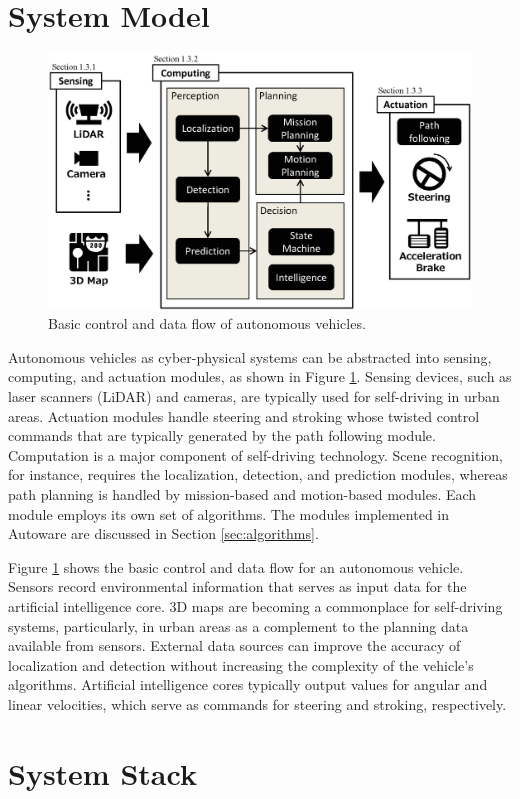 \section{System Model}
\label{sec:system_model}

\begin{figure}[!htbp]
  \centering
  \includegraphics[width=0.6\linewidth]{../figure/Autoware/system_model.eps}
  \caption{\label{fig:system_model}
    Basic control and data flow of autonomous vehicles.}
\end{figure}

Autonomous vehicles as cyber-physical systems can be abstracted into
sensing, computing, and actuation modules, as shown in Figure
\ref{fig:system_model}.
Sensing devices, such as laser scanners (LiDAR) and cameras, are typically used for self-driving in urban areas.
Actuation modules handle steering and stroking whose
twisted control commands that are typically generated by the path following module.
Computation is a major component of self-driving technology.
Scene recognition, for instance, requires the localization, detection, and
prediction modules, whereas path planning is handled by mission-based and
motion-based modules.
Each module employs its own set of algorithms.
The modules implemented in Autoware are discussed in Section
\ref{sec:algorithms}.

Figure \ref{fig:system_model} shows the basic control and data flow for an
autonomous vehicle.
Sensors record environmental information that serves as input data for the
artificial intelligence core.
3D maps are becoming a commonplace for self-driving systems, particularly,
in urban areas as a complement to the planning data available from sensors.
External data sources can improve the accuracy of
localization and detection without increasing the complexity of the vehicle's algorithms.
Artificial intelligence cores typically output values for angular and linear
velocities, which serve as commands for steering and stroking, respectively.

\section{System Stack}

